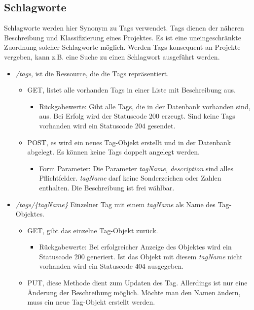 \documentclass[12pt]{scrartcl}
\begin{document}
\subsection{Schlagworte}
Schlagworte werden hier Synonym zu Tags verwendet.
Tags dienen der näheren Beschreibung und Klassifizierung eines Projektes. Es ist eine uneingeschränkte Zuordnung solcher Schlagworte möglich. Werden Tags konsequent an Projekte vergeben, kann z.B. eine Suche zu einen Schlagwort ausgeführt werden. 
\begin{itemize}
	\item \emph{/tags}, ist die Ressource, die die Tags repräsentiert.
	\begin{itemize}
		\item GET, listet alle vorhanden Tags in einer Liste mit Beschreibung aus.
		\begin{itemize}
			\item Rückgabewerte: Gibt alle Tags, die in der Datenbank vorhanden sind, aus. Bei Erfolg wird der Statuscode 200 erzeugt. Sind keine Tags vorhanden wird ein Statuscode 204 gesendet. 
		\end{itemize}
		\item POST, es wird ein neues Tag-Objekt erstellt und in der Datenbank abgelegt. Es können keine Tags doppelt angelegt werden.
		\begin{itemize}
			\item Form Parameter: Die Parameter \emph{tagName, description} sind alles Pflichtfelder. \emph{tagName} darf keine Sonderzeichen oder Zahlen enthalten. Die Beschreibung ist frei wählbar. 
		\end{itemize} 
	\end{itemize}
	\item \emph{/tags/\{tagName\}} Einzelner Tag mit einem \emph{tagName} als Name des Tag-Objektes.
	\begin{itemize}
		\item GET, gibt das einzelne Tag-Objekt zurück.
		\begin{itemize}
			\item Rückgabewerte: Bei erfolgreicher Anzeige des Objektes wird ein Statuscode 200 generiert. Ist das Objekt mit diesem \emph{tagName} nicht vorhanden wird ein Statuscode 404 ausgegeben.
		\end{itemize}
		\item PUT, diese Methode dient zum Updaten des Tag. Allerdings ist nur eine Änderung der Beschreibung möglich. Möchte man den Namen ändern, muss ein neue Tag-Objekt erstellt werden.
		\begin{itemize}

\end{itemize}
\end{itemize}
\end{itemize}
\end{document}

